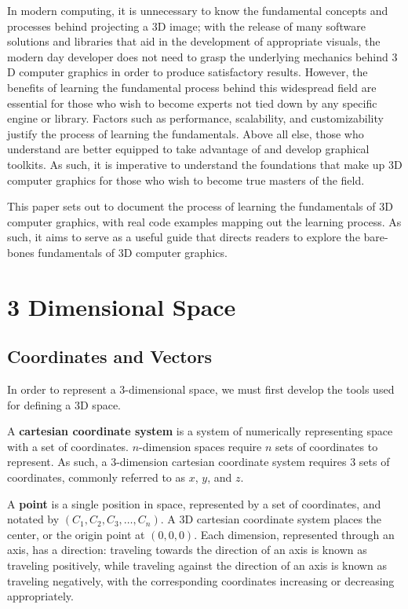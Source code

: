 \documentclass[a4paper]{article}
\begin{document}
In modern computing, it is unnecessary to know the fundamental concepts and processes behind projecting a $3$D image; with the release of many software solutions and libraries that aid in the development of appropriate visuals, the modern day developer does not need to grasp the underlying mechanics behind $3$D computer graphics in order to produce satisfactory results. However, the benefits of learning the fundamental process behind this widespread field are essential for those who wish to become experts not tied down by any specific engine or library. Factors such as performance, scalability, and customizability justify the process of learning the fundamentals. Above all else, those who understand are better equipped to take advantage of and develop graphical toolkits. As such, it is imperative to understand the foundations that make up $3$D computer graphics for those who wish to become true masters of the field.

This paper sets out to document the process of learning the fundamentals of $3$D computer graphics, with real code examples mapping out the learning process. As such, it aims to serve as a useful guide that directs readers to explore the bare-bones fundamentals of $3$D computer graphics.

\newpage
\section{3 Dimensional Space}
\subsection{Coordinates and Vectors}


In order to represent a $3$-dimensional space, we must first develop the tools used for defining a $3$D space.

A \textbf{cartesian coordinate system} is a system of numerically representing space with a set of coordinates. 
$n$-dimension spaces require $n$ sets of coordinates to represent. As such, a $3$-dimension cartesian coordinate system requires $3$ sets of coordinates, commonly referred to as $x$, $y$, and $z$.

A \textbf{point} is a single position in space, represented by a set of coordinates, and notated by $(C_{1} , C_{2}, C_{3}, \ldots, C_{n})$. A $3$D cartesian coordinate system places the center, or the origin point at $(0, 0, 0)$. Each dimension, represented through an axis, has a direction: traveling towards the direction of an axis is known as traveling positively, while traveling against the direction of an axis is known as traveling negatively, with the corresponding coordinates increasing or decreasing appropriately.\autocite{Eldridge2023}
\end{document}
